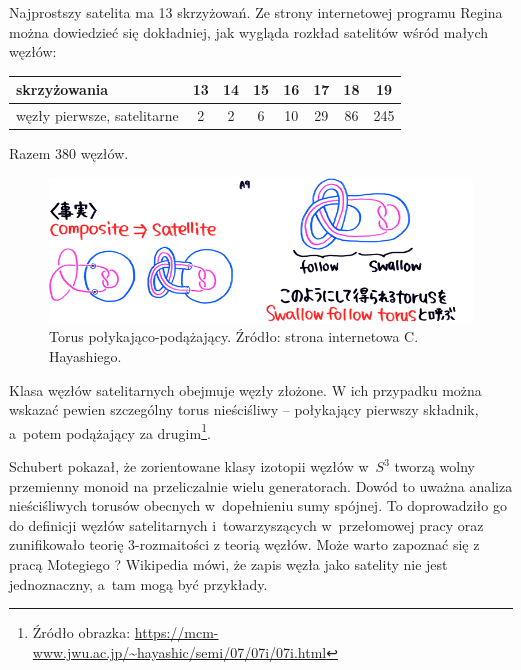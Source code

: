 Najprostszy satelita ma 13 skrzyżowań.
Ze strony internetowej programu Regina można dowiedzieć się dokładniej, jak wygląda rozkład satelitów wśród małych węzłów:

\renewcommand*{\arraystretch}{1.4}
\footnotesize
\begin{longtable}{lccccccc}
    \hline
    \textbf{skrzyżowania} & 13 & 14 & 15 & 16 & 17 & 18 & 19 \\ \hline \endhead
    węzły pierwsze, satelitarne & 2 & 2 & 6 & 10 & 29 & 86 & 245 \\
    \hline
\end{longtable}
\normalsize

Razem 380 węzłów.

\begin{example}
\label{swallow_follow_torus}
%
    \begin{figure}[H]
        \centering
        \includegraphics[width=0.75\linewidth]{../data/mixed/follow-swallow.png}
        \caption[something]{Torus połykająco-podążający. Źródło: strona internetowa  C. Hayashiego.}
    \end{figure}
    Klasa węzłów satelitarnych obejmuje węzły złożone.
    W ich przypadku można wskazać pewien szczególny torus nieściśliwy -- połykający pierwszy składnik, a~potem podążający za drugim\footnote{Źródło obrazka: \url{https://mcm-www.jwu.ac.jp/~hayashic/semi/07/07i/07i.html}}.
\end{example}

Schubert pokazał, że zorientowane klasy izotopii węzłów w~$S^3$ tworzą wolny przemienny monoid na przeliczalnie wielu generatorach.
%
Dowód to uważna analiza nieściśliwych torusów obecnych w~dopełnieniu sumy spójnej.
To doprowadziło go do definicji węzłów satelitarnych i~towarzyszących w~przełomowej pracy \cite{schubert1953} oraz zunifikowało teorię 3-rozmaitości z teorią węzłów.
Może warto zapoznać się z pracą Motegiego \cite{motegi1997}?
Wikipedia mówi, że zapis węzła jako satelity nie jest jednoznaczny, a~tam mogą być przykłady.

